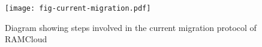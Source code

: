 \begin{figure}[H]
\texttt{[image: fig-current-migration.pdf]}
\caption{Diagram showing steps involved in the current migration protocol of RAMCloud}
\label{fig:migration-current}
\end{figure}
